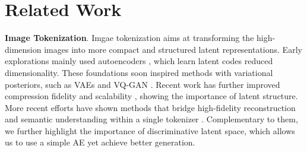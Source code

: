 \section{Related Work}
\label{sec:related}


\textbf{Image Tokenization}. 
Imgae tokenization aims at transforming the high-dimension images into more compact and structured latent representations. 
Early explorations mainly used autoencoders \cite{hinton2006reducing,vincent2008extracting}, which learn latent codes reduced dimensionality. 
These foundations soon inspired methods with variational posteriors,
such as VAEs \cite{van2017neural,razavi2019generating} and VQ-GAN \cite{esser2021taming,razavi2019generatingdiversehighfidelityimages}. 
Recent work has further improved compression fidelity and scalability \cite{lee2022autoregressive,yu2024language,mentzer2023finite,zhu2024scaling}, showing the importance of latent structure.
More recent efforts have shown methods that bridge high-fidelity reconstruction and semantic understanding within a single tokenizer \cite{yu2024an,li2024imagefolder,chen2024softvq,wu2024vila,gu2023rethinkingobjectivesvectorquantizedtokenizers}. 
Complementary to them, we further highlight the importance of discriminative latent space, which allows us to use a simple AE yet achieve better generation. 



